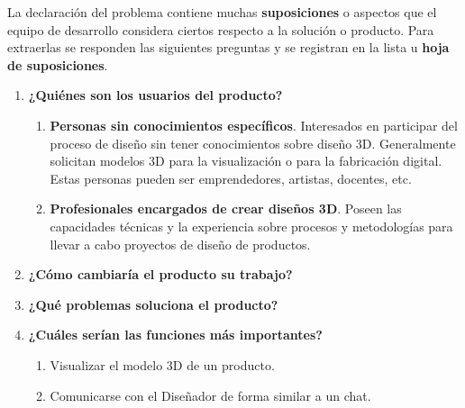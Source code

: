 \vspace{5mm}

La declaración del problema contiene muchas \textbf{suposiciones} o aspectos que el equipo de desarrollo considera ciertos respecto a la solución o producto. Para extraerlas se responden las siguientes preguntas y se registran en la lista u \textbf{hoja de suposiciones}. 


\begin{enumerate}

\item\textbf{¿Quiénes son los usuarios del producto?}
\begin{enumerate}
\item \textbf{Personas sin conocimientos específicos}.
Interesados en participar del proceso de diseño sin tener conocimientos sobre diseño 3D. Generalmente solicitan modelos 3D para la visualización o para la fabricación digital. Estas personas pueden ser emprendedores, artistas, docentes, etc.

\item \textbf{Profesionales encargados de crear diseños 3D}. 
Poseen las capacidades técnicas y la experiencia sobre procesos y metodologías para llevar a cabo proyectos de diseño de productos.

\end{enumerate}

\item{\textbf{¿Cómo cambiaría el producto su trabajo?}}


\item{\textbf{¿Qué problemas soluciona el producto?}}

    \item{\textbf{¿Cuáles serían las funciones más importantes?}}
    \begin{enumerate}
        \item Visualizar el modelo 3D de un producto.
        \item Comunicarse con el Diseñador de forma similar a un chat.
    \end{enumerate}


\end{enumerate}
